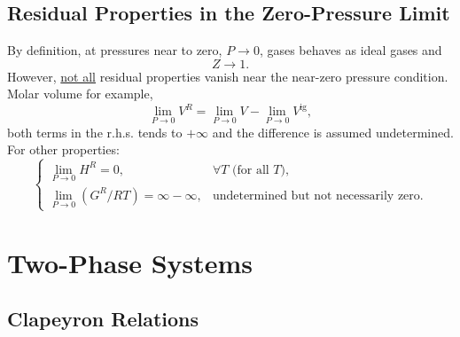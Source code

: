   \subsection{Residual Properties in the Zero-Pressure Limit}\label{Chapter:ThermodynamicPropertiesPureFluids:Section:ResidualProperties:ZeroPressure}
      
       By definition, at pressures near to zero, \ie $ P\rightarrow 0$, gases behaves as ideal gases and 
            \begin{displaymath}
              Z\rightarrow 1.
            \end{displaymath}
       However, \underline{not all} residual properties vanish near the near-zero pressure condition. Molar volume for example,
       \begin{displaymath}
           \lim\limits_{P\rightarrow 0}V^{R} = \lim\limits_{P\rightarrow 0}V - \lim\limits_{P\rightarrow 0}V^{\text{ig}},
       \end{displaymath}
both terms in the r.h.s. tends to $+\infty$ and the difference is assumed undetermined. For other properties:
       \begin{displaymath}
          \begin{cases}
             \lim\limits_{P\rightarrow 0}H^{R} = 0, & \forall T \text{ (for all $T$)}, \\
             \lim\limits_{P\rightarrow 0}\left(G^{R}/RT\right) = \infty-\infty,& \text{undetermined but not necessarily zero}.  
          \end{cases}
       \end{displaymath}


\section{Two-Phase Systems}\label{Chapter:ThermodynamicPropertiesPureFluids:Section:Two_Phase}

  \subsection{Clapeyron Relations}\label{Chapter:ThermodynamicPropertiesPureFluids:Section:ClapeyronRelations}

